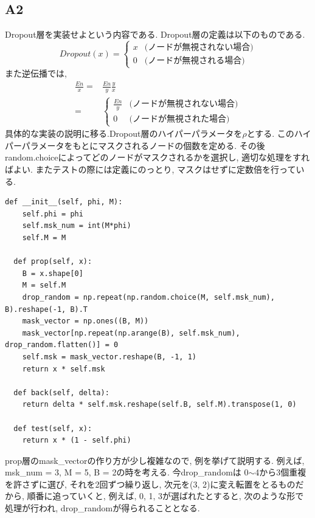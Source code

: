 \documentclass[a4paper,11pt]{jsarticle}
\begin{document}
\subsection{A2}
Dropout層を実装せよという内容である. Dropout層の定義は以下のものである.
\begin{equation}
  Dropout(x) =
  \begin{cases}
    x & \text{(ノードが無視されない場合)} \\
    0 & \text{(ノードが無視される場合)}
  \end{cases}
\end{equation}
また逆伝播では,
\begin{equation}
  \begin{split}
    \frac{En}{x} = & \frac{En}{y}\frac{y}{x}  \\= &
    \begin{cases}
      \frac{En}{y} & \text{(ノードが無視されない場合)} \\
      0            & \text{(ノードが無視された場合)}
    \end{cases}
  \end{split}
\end{equation}
具体的な実装の説明に移る.Dropout層のハイパーパラメータを$\rho$とする.
このハイパーパラメータをもとにマスクされるノードの個数を定める.
その後random.choiceによってどのノードがマスクされるかを選択し,
適切な処理をすればよい. またテストの際には定義にのっとり,
マスクはせずに定数倍を行っている.
\begin{lstlisting}[caption=Dropout]
  def __init__(self, phi, M):
    self.phi = phi
    self.msk_num = int(M*phi)
    self.M = M

  def prop(self, x):
    B = x.shape[0]
    M = self.M
    drop_random = np.repeat(np.random.choice(M, self.msk_num), B).reshape(-1, B).T
    mask_vector = np.ones((B, M))
    mask_vector[np.repeat(np.arange(B), self.msk_num), drop_random.flatten()] = 0
    self.msk = mask_vector.reshape(B, -1, 1)
    return x * self.msk

  def back(self, delta):
    return delta * self.msk.reshape(self.B, self.M).transpose(1, 0)

  def test(self, x):
    return x * (1 - self.phi)
\end{lstlisting}
prop層のmask\_vectorの作り方が少し複雑なので, 例を挙げて説明する.
例えば, msk\_num = 3, M = 5, B = 2の時を考える. 今drop\_randomは
0$\sim$4から3個重複を許さずに選び, それを2回ずつ繰り返し, 次元を(3, 2)に変え転置をとるものだから, 順番に追っていくと,
例えば, 0, 1, 3が選ばれたとすると, 次のような形で処理が行われ, drop\_randomが得られることとなる.
\end{document}
